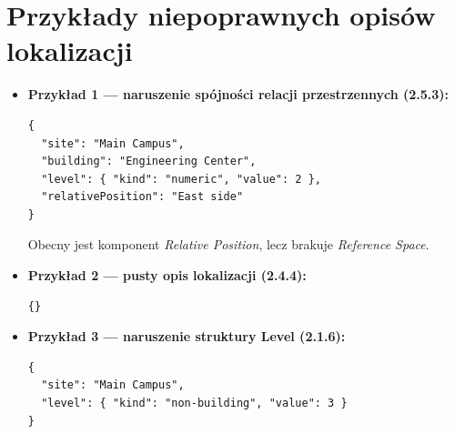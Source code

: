 \section{Przykłady niepoprawnych opisów lokalizacji}
\label{sec:przyklady-niepoprawne}
\begin{itemize}
    \item \textbf{Przykład 1 --- naruszenie spójności relacji przestrzennych (2.5.3):}
\begin{verbatim}
{
  "site": "Main Campus",
  "building": "Engineering Center",
  "level": { "kind": "numeric", "value": 2 },
  "relativePosition": "East side"
}
\end{verbatim}
Obecny jest komponent \textit{Relative Position}, lecz brakuje \textit{Reference Space}.

    \item \textbf{Przykład 2 --- pusty opis lokalizacji (2.4.4):}
\begin{verbatim}
{}
\end{verbatim}

    \item \textbf{Przykład 3 --- naruszenie struktury Level (2.1.6):}
\begin{verbatim}
{
  "site": "Main Campus",
  "level": { "kind": "non-building", "value": 3 }
}
\end{verbatim}
\end{itemize}
